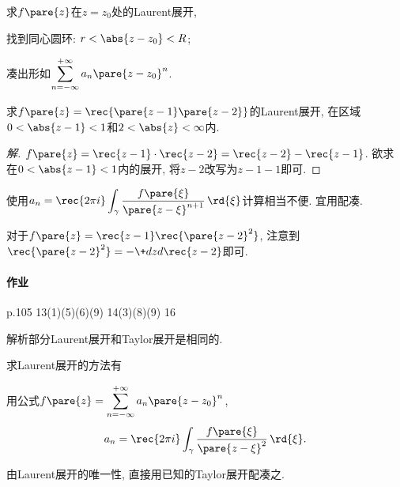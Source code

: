\documentclass{ctexart}
\begin{document}
\par
求$f\pare{z}$在$z=z_0$处的Laurent展开,
\begin{cenum}
    \item 找到同心圆环: $r<\abs{z-z_0}<R$;
    \item 凑出形如$\displaystyle \sum_{n=-\infty}^{+\infty} a_n\pare{z-z_0}^{n}$.
\end{cenum}
\begin{sample}
    \begin{ex}
        求$\displaystyle f\pare{z} = \rec{\pare{z-1}\pare{z-2}}$的Laurent展开, 在区域$0<\abs{z-1}<1$和$2<\abs{z}<\infty$内.
    \end{ex}
    \begin{proof}[解]
        $\displaystyle f\pare{z} = \rec{z-1}\cdot\rec{z-2} = \rec{z-2} - \rec{z-1}$. 欲求在$0 < \abs{z-1} < 1$内的展开, 将$z-2$改写为$z-1-1$即可.
    \end{proof}
    \begin{remark}
        使用$\displaystyle a_n = \rec{2\pi i} \int_\gamma \frac{f\pare{\xi}}{\pare{z-\xi}^{n+1}}\,\rd{\xi}$计算相当不便. 宜用配凑.
    \end{remark}
    \begin{remark}
        对于$\displaystyle f\pare{z} = \rec{z-1} \rec{\pare{z-2}^2}$, 注意到$\displaystyle \rec{\pare{z-2}^2} = -\+dzd{} \rec{z-2}$即可.
    \end{remark}
\end{sample}


\paragraph{作业} %
\label{par:作业}

p.105 13(1)(5)(6)(9) 14(3)(8)(9) 16


\begin{remark}
    解析部分Laurent展开和Taylor展开是相同的.
\end{remark}
求Laurent展开的方法有
\begin{cenum}
    \item 用公式$f\pare{z} = \displaystyle \sum_{n=-\infty}^{+\infty} a_n\pare{z-z_0}^n$,
    \[ a_n = \rec{2\pi i} \int_\gamma \frac{f\pare{\xi}}{\pare{z-\xi}^2}\,\rd{\xi}. \]
    \item 由Laurent展开的唯一性, 直接用已知的Taylor展开配凑之.
\end{cenum}

\end{document}
